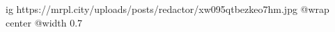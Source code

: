  
 
 
 
 

\ifcmt
  ig https://mrpl.city/uploads/posts/redactor/xw095qtbezkeo7hm.jpg
  @wrap center
  @width 0.7
\fi
